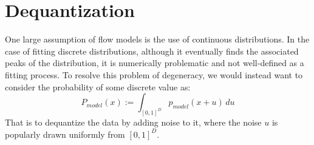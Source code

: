 \section{Dequantization}
One large assumption of flow models is the use of continuous distributions.
In the case of fitting discrete distributions, although it eventually finds the associated peaks of the distribution, it is numerically problematic and not well-defined as a fitting process.
To resolve this problem of degeneracy, we would instead want to consider the probability of some discrete value as:
\[
    P_{model} (x) := \int_{{[0, 1]}^D} p_{model} (x + u) \, du
\]
That is to dequantize the data by adding noise to it, where the noise $u$ is popularly drawn uniformly from ${[0, 1]}^D$.
